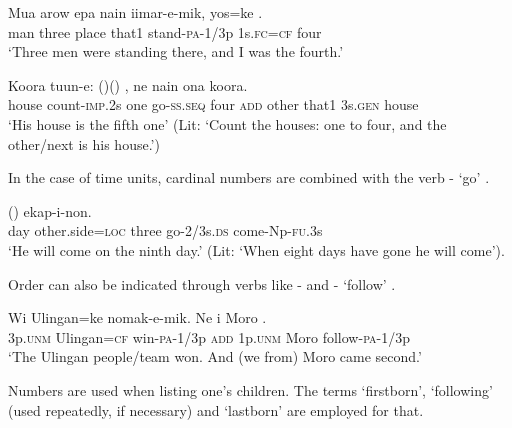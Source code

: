 \ea%
\label{ex:3:x96}
\gll Mua arow epa nain iimar-e-mik, yos=ke . \\
man three place that1 stand-\textsc{pa}-1/3p 1s.\textsc{fc}=\textsc{cf} four\\
\glt`Three men were standing there, and I was the fourth.'
\z

\ea%
\label{ex:3:x428}
\gll Koora tuun-e:  ()\textstyleEmphasizedVernacularWords{-}() , ne   nain ona koora.\\
house count-\textsc{imp}.2s one go-\textsc{ss}.\textsc{seq} four \textsc{add} other that1 3s.\textsc{gen} house\\
\glt`His house is the fifth one' (Lit: `Count the houses: one to four, and the other/next is his house.')
\z

In the case of time units, cardinal numbers are combined with the verb - `go' .

\ea%
\label{ex:3:x427}
\gll {} ()   ekap-i-non. \\
day other.side=\textsc{loc} three go-2/3s.\textsc{ds} come-Np-\textsc{fu}.3s\\
\glt`He will come on the ninth day.' (Lit: `When eight days have gone he will come').
\z

Order can also be indicated through verbs like - and - `follow' . 

\ea%
\label{ex:3:x98}
\gll Wi Ulingan=ke nomak-e-mik. Ne i Moro .\\
3p.\textsc{unm} Ulingan=\textsc{cf} win-\textsc{pa}-1/3p \textsc{add} 1p.\textsc{unm} Moro follow-\textsc{pa}-1/3p\\
\glt`The Ulingan people/team won. And (we from) Moro came second.'
\z

Numbers are  used when listing one's children. The terms  `firstborn',  `following' (used repeatedly, if necessary) and  `lastborn' are employed for that.

